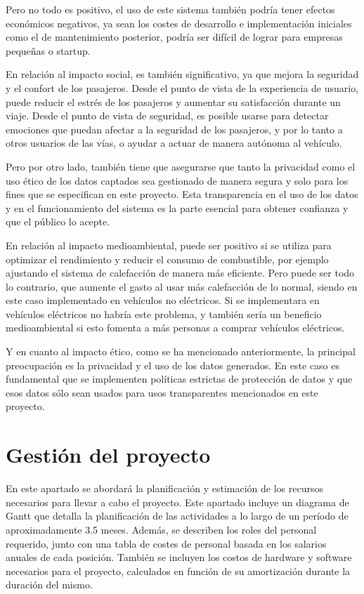 \documentclass[12pt]{report} %
\begin{document}
Pero no todo es positivo, el uso de este sistema también podría tener efectos económicos negativos, ya sean los costes de desarrollo e implementación iniciales como el de mantenimiento posterior, podría ser difícil de lograr para empresas pequeñas o startup.

En relación al impacto social, es también significativo, ya que mejora la seguridad y el confort de los pasajeros. Desde el punto de vista de la experiencia de usuario, puede reducir el estrés de los pasajeros y aumentar su satisfacción durante un viaje. Desde el punto de vista de seguridad, es posible usarse para detectar emociones que puedan afectar a la seguridad de los pasajeros, y por lo tanto a otros usuarios de las vías, o ayudar a actuar de manera autónoma al vehículo.

Pero por otro lado, también tiene que asegurarse que tanto la privacidad como el uso ético de los datos captados sea gestionado de manera segura y solo para los fines que se especifican en este proyecto. Esta transparencia en el uso de los datos y en el funcionamiento del sistema es la parte esencial para obtener confianza y que el público lo acepte.

En relación al impacto medioambiental, puede ser positivo si se utiliza para optimizar el rendimiento y reducir el consumo de combustible, por ejemplo ajustando el sistema de calefacción de manera más eficiente. Pero puede ser todo lo contrario, que aumente el gasto al usar más calefacción de lo normal, siendo en este caso implementado en vehículos no eléctricos. Si se implementara en vehículos eléctricos no habría este problema, y también sería un beneficio medioambiental si esto fomenta a más personas a comprar vehículos eléctricos.

Y en cuanto al impacto ético, como se ha mencionado anteriormente, la principal preocupación es la privacidad y el uso de los datos generados. En este caso es fundamental que se implementen políticas estrictas de protección de datos y que esos datos sólo sean usados para usos transparentes mencionados en este proyecto.



\chapter{Gestión del proyecto}

En este apartado se abordará la planificación y estimación de los recursos necesarios para llevar a cabo el proyecto. Este apartado incluye un diagrama de Gantt que detalla la planificación de las actividades a lo largo de un período de aproximadamente 3.5 meses. Además, se describen los roles del personal requerido, junto con una tabla de costes de personal basada en los salarios anuales de cada posición. También se incluyen los costos de hardware y software necesarios para el proyecto, calculados en función de su amortización durante la duración del mismo.
\end{document}
